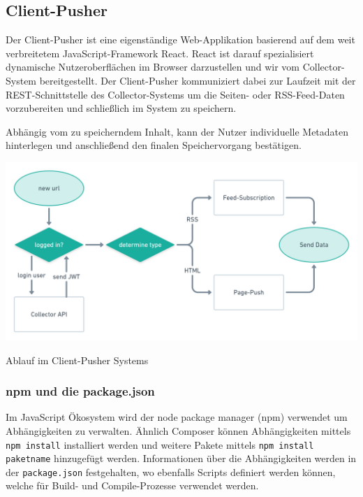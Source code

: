     \subsection{Client-Pusher}
        Der Client-Pusher ist eine eigenständige Web-Applikation basierend auf dem weit verbreitetem JavaScript-Framework React. React ist darauf spezialisiert dynamische Nutzeroberflächen im Browser darzustellen und wir vom Collector-System bereitgestellt. Der Client-Pusher kommuniziert dabei zur Laufzeit mit der REST-Schnittstelle des Collector-Systems um die Seiten- oder RSS-Feed-Daten vorzubereiten und schließlich im System zu speichern.

        Abhängig vom zu speicherndem Inhalt, kann der Nutzer individuelle Metadaten hinterlegen und anschließend den finalen Speichervorgang bestätigen.

        \begin{center}
            \includegraphics[width=\textwidth]{images/collector-pusher-process.png}
            \caption{Ablauf im Client-Pusher Systems}
        \end{center}
        
        \subsubsection{npm und die package.json}
            Im JavaScript Ökosystem wird der node package manager (npm) verwendet um Abhängigkeiten zu verwalten. Ähnlich Composer können Abhängigkeiten mittels \texttt{npm install} installiert werden und weitere Pakete mittels \texttt{npm install paketname} hinzugefügt werden. Informationen über die Abhängigkeiten werden in der \texttt{package.json} festgehalten, wo ebenfalls Scripts definiert werden können, welche für Build- und Compile-Prozesse verwendet werden.
            
